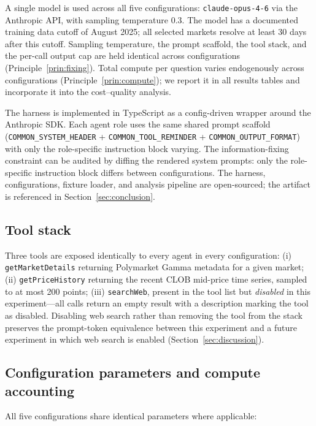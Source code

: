 \documentclass[11pt]{article}
\begin{document}
A single model is used across all five configurations: \texttt{claude-opus-4-6} via the Anthropic API, with sampling temperature 0.3. The model has a documented training data cutoff of August 2025; all selected markets resolve at least 30 days after this cutoff. Sampling temperature, the prompt scaffold, the tool stack, and the per-call output cap are held identical across configurations (Principle~\ref{prin:fixing}). Total compute per question varies endogenously across configurations (Principle~\ref{prin:compute}); we report it in all results tables and incorporate it into the cost--quality analysis.

The harness is implemented in TypeScript as a config-driven wrapper around the Anthropic SDK. Each agent role uses the same shared prompt scaffold (\texttt{COMMON\_SYSTEM\_HEADER} + \texttt{COMMON\_TOOL\_REMINDER} + \texttt{COMMON\_OUTPUT\_FORMAT}) with only the role-specific instruction block varying. The information-fixing constraint can be audited by diffing the rendered system prompts: only the role-specific instruction block differs between configurations. The harness, configurations, fixture loader, and analysis pipeline are open-sourced; the artifact is referenced in Section~\ref{sec:conclusion}.

\subsection{Tool stack}
\label{sec:experiment-tools}

Three tools are exposed identically to every agent in every configuration: (i) \texttt{getMarketDetails} returning Polymarket Gamma metadata for a given market; (ii) \texttt{getPriceHistory} returning the recent CLOB mid-price time series, sampled to at most 200 points; (iii) \texttt{searchWeb}, present in the tool list but \emph{disabled} in this experiment---all calls return an empty result with a description marking the tool as disabled. Disabling web search rather than removing the tool from the stack preserves the prompt-token equivalence between this experiment and a future experiment in which web search is enabled (Section~\ref{sec:discussion}).

\subsection{Configuration parameters and compute accounting}
\label{sec:experiment-params}

All five configurations share identical parameters where applicable:
\end{document}
